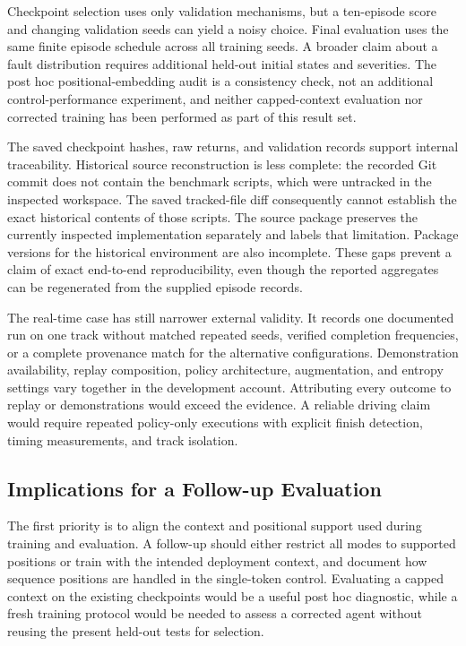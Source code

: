 \documentclass[runningheads]{llncs}
\begin{document}
Checkpoint selection uses only validation mechanisms, but a ten-episode score and changing validation seeds can yield a noisy choice. Final evaluation uses the same finite episode schedule across all training seeds. A broader claim about a fault distribution requires additional held-out initial states and severities. The post hoc positional-embedding audit is a consistency check, not an additional control-performance experiment, and neither capped-context evaluation nor corrected training has been performed as part of this result set.

The saved checkpoint hashes, raw returns, and validation records support internal traceability. Historical source reconstruction is less complete: the recorded Git commit does not contain the benchmark scripts, which were untracked in the inspected workspace. The saved tracked-file diff consequently cannot establish the exact historical contents of those scripts. The source package preserves the currently inspected implementation separately and labels that limitation. Package versions for the historical environment are also incomplete. These gaps prevent a claim of exact end-to-end reproducibility, even though the reported aggregates can be regenerated from the supplied episode records.

The real-time case has still narrower external validity. It records one documented run on one track without matched repeated seeds, verified completion frequencies, or a complete provenance match for the alternative configurations. Demonstration availability, replay composition, policy architecture, augmentation, and entropy settings vary together in the development account. Attributing every outcome to replay or demonstrations would exceed the evidence. A reliable driving claim would require repeated policy-only executions with explicit finish detection, timing measurements, and track isolation.

\subsection{Implications for a Follow-up Evaluation}
The first priority is to align the context and positional support used during training and evaluation. A follow-up should either restrict all modes to supported positions or train with the intended deployment context, and document how sequence positions are handled in the single-token control. Evaluating a capped context on the existing checkpoints would be a useful post hoc diagnostic, while a fresh training protocol would be needed to assess a corrected agent without reusing the present held-out tests for selection.
\end{document}
